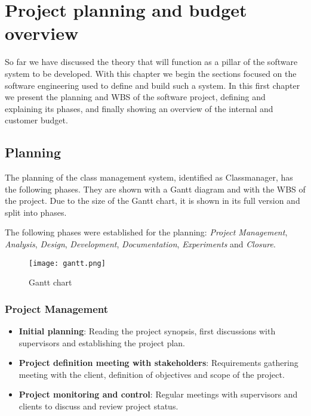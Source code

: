 \renewcommand{\documentname}{Project planning and budget overview}

\chapter{Project planning and budget overview}

So far we have discussed the theory that will function as a pillar of the software system to be developed. With this chapter we begin the sections focused on the software engineering used to define and build such a system. In this first chapter we present the planning and WBS of the software project, defining and explaining its phases, and finally showing an overview of the internal and customer budget.


\section{Planning}

The planning of the class management system, identified as Classmanager, has the following phases. They are shown with a Gantt diagram and with the WBS of the project. Due to the size of the Gantt chart, it is shown in its full version and split into phases. 

The following phases were established for the planning: \textit{Project Management}, \textit{Analysis}, \textit{Design}, \textit{Development}, \textit{Documentation}, \textit{Experiments} and \textit{Closure}.


\begin{figure}[H]
    \caption{Gantt chart}
  \centering
  \texttt{[image: gantt.png]}
\end{figure}


\subsection{Project Management}

\begin{itemize}
    \item \textbf{Initial planning}: Reading the project synopsis, first discussions with supervisors and establishing the project plan. 
    \item \textbf{Project definition meeting with stakeholders}: Requirements gathering meeting with the client, definition of objectives and scope of the project.
    \item \textbf{Project monitoring and control}: Regular meetings with supervisors and clients to discuss and review project status. 
\end{itemize}

